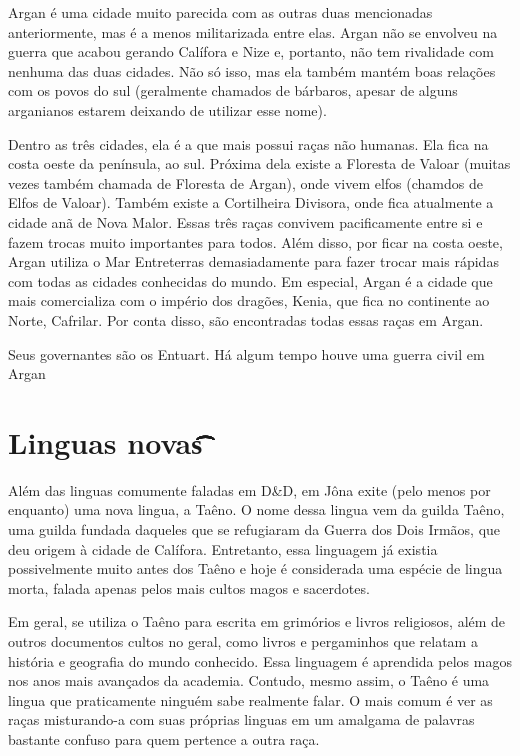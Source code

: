 \documentclass{RPG_Adventure}[2021/10/20]
\begin{document}
Argan é uma cidade muito parecida com as outras duas mencionadas anteriormente,
mas é a menos militarizada entre elas. Argan não se envolveu na guerra que
acabou gerando Calífora e Nize e, portanto, não tem rivalidade com nenhuma das
duas cidades. Não só isso, mas ela também mantém boas relações com os povos do
sul (geralmente chamados de bárbaros, apesar de alguns arganianos estarem
deixando de utilizar esse nome).

Dentro as três cidades, ela é a que mais possui raças não humanas. Ela fica na
costa oeste da península, ao sul. Próxima dela existe a Floresta de Valoar
(muitas vezes também chamada de Floresta de Argan), onde vivem elfos (chamdos de
Elfos de Valoar). Também existe a Cortilheira Divisora, onde fica atualmente a
cidade anã de Nova Malor. Essas três raças convivem pacificamente entre si e
fazem trocas muito importantes para todos. Além disso, por ficar na costa oeste,
Argan utiliza o Mar Entreterras demasiadamente para fazer trocar mais rápidas
com todas as cidades conhecidas do mundo. Em especial, Argan é a cidade que mais
comercializa com o império dos dragões, Kenia, que fica no continente ao Norte,
Cafrilar. Por conta disso, são encontradas todas essas raças em Argan.

Seus governantes são os Entuart. Há algum tempo houve uma guerra civil em Argan


\section{Linguas novas\t\t\t\t\t\t\t\t}%
\label{sec:linguas_novas}

Além das linguas comumente faladas em D&D, em Jôna exite (pelo menos por
enquanto) uma nova lingua, a Taêno. O nome dessa lingua vem da guilda Taêno, uma
guilda fundada daqueles que se refugiaram da Guerra dos Dois Irmãos, que deu
origem à cidade de Calífora. Entretanto, essa linguagem já existia possivelmente
muito antes dos Taêno e hoje é considerada uma espécie de lingua morta, falada
apenas pelos mais cultos magos e sacerdotes.

Em geral, se utiliza o Taêno para escrita em grimórios e livros religiosos, além
de outros documentos cultos no geral, como livros e pergaminhos que relatam a
história e geografia do mundo conhecido. Essa linguagem é aprendida pelos magos
nos anos mais avançados da academia. Contudo, mesmo assim, o Taêno é uma lingua
que praticamente ninguém sabe realmente falar. O mais comum é ver as raças
misturando-a com suas próprias linguas em um amalgama de palavras bastante
confuso para quem pertence a outra raça.
\end{document}
